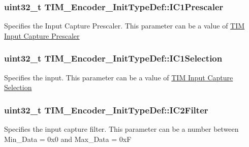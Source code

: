 \subsubsection[{\texorpdfstring{I\+C1\+Prescaler}{IC1Prescaler}}]{\setlength{\rightskip}{0pt plus 5cm}uint32\+\_\+t T\+I\+M\+\_\+\+Encoder\+\_\+\+Init\+Type\+Def\+::\+I\+C1\+Prescaler}\hypertarget{struct_t_i_m___encoder___init_type_def_a56307eb4766e3f0e1cd1cd3c4fc2157e}{}\label{struct_t_i_m___encoder___init_type_def_a56307eb4766e3f0e1cd1cd3c4fc2157e}
Specifies the Input Capture Prescaler. This parameter can be a value of \hyperlink{group___t_i_m___input___capture___prescaler}{T\+IM Input Capture Prescaler} 
\subsubsection[{\texorpdfstring{I\+C1\+Selection}{IC1Selection}}]{\setlength{\rightskip}{0pt plus 5cm}uint32\+\_\+t T\+I\+M\+\_\+\+Encoder\+\_\+\+Init\+Type\+Def\+::\+I\+C1\+Selection}\hypertarget{struct_t_i_m___encoder___init_type_def_a85fbdebacff594ff1ad0d16eddfdc179}{}\label{struct_t_i_m___encoder___init_type_def_a85fbdebacff594ff1ad0d16eddfdc179}
Specifies the input. This parameter can be a value of \hyperlink{group___t_i_m___input___capture___selection}{T\+IM Input Capture Selection} 
\subsubsection[{\texorpdfstring{I\+C2\+Filter}{IC2Filter}}]{\setlength{\rightskip}{0pt plus 5cm}uint32\+\_\+t T\+I\+M\+\_\+\+Encoder\+\_\+\+Init\+Type\+Def\+::\+I\+C2\+Filter}\hypertarget{struct_t_i_m___encoder___init_type_def_a30cdb580735007aa9735b2f5cc133049}{}\label{struct_t_i_m___encoder___init_type_def_a30cdb580735007aa9735b2f5cc133049}
Specifies the input capture filter. This parameter can be a number between Min\+\_\+\+Data = 0x0 and Max\+\_\+\+Data = 0xF 
